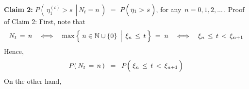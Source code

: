 \vskip 0.5cm
\noindent
\textbf{Claim 2:}\quad
$P\!\left(\,\left.\eta^{(t)}_{1} > s \;\,\right\vert\, N_{t} = n\,\right)$\;
$=$
\;$P\!\left(\,\eta_{1} > \overset{{\color{white}-}}{s}\,\right)$,\;\;
for any \,$n = 0, 1, 2, \ldots$\,.
\vskip 0.2cm
\noindent
Proof of Claim 2:\quad
First, note that
\begin{equation*}
N_{t}\,=\,n
\quad\Longleftrightarrow\quad
	\max\left\{\,\left.
	n \overset{{\color{white}.}}{\in} \N\cup\{0\}
	\,\;\right\vert\;
	\xi_{n} \,\leq\, t
	\,\right\}
	\;=\; n
\quad\Longleftrightarrow\quad
	\xi_{n} \,\overset{{\color{white}.}}{\leq}\, t \,<\, \xi_{n+1}
\end{equation*}
Hence,
\begin{equation*}
P(\,N_{t}\,=\,n\,)
\;\; = \;\;
	P\!\left(\; \xi_{n} \,\overset{{\color{white}.}}{\leq}\, t \,<\, \xi_{n+1} \,\right)
\end{equation*}
On the other hand,
